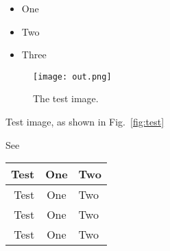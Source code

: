 \begin{itemize}
\item One
\item Two
\item Three
\end{itemize}

\begin{figure}
\centering
\texttt{[image: out.png]}
\caption{\label{fig:test} The test image.}
\end{figure}

\unknowncommand

Test image, as shown in Fig.~\vref{fig:test}

See \cite{Zott_Reinke_Delaney_Boult_2013}

\begin{table}[t]
\centering
\begin{tabular}{r|c l}
Test & One & Two \\
\hline
Test & One & Two \\Test & One & Two \\Test & One & Two \\
\end{tabular}
\end{table}

